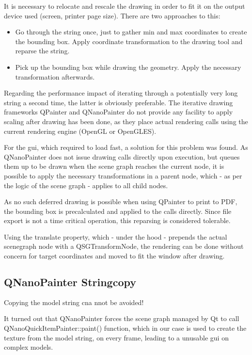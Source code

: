It is necessary to relocate and rescale the drawing in order to fit it on the output device used  (screen, printer page size). There are two approaches to this:
\begin{itemize}
	\item Go through the string once, just to gather min and max coordinates to create the bounding box. Apply coordinate transformation to the drawing tool and reparse the string.
	\item Pick up the bounding box while drawing the geometry. Apply the necessary transformation afterwards.
\end{itemize}
Regarding the performance impact of iterating through a potentially very long string a second time, the latter is obviously preferable. The iterative drawing frameworks QPainter and QNanoPainter do not provide any facility to apply scaling after drawing has been done, as they place actual rendering calls using the current rendering engine (OpenGL or OpenGLES).

For the \gls{gui}, which required to load fast, a solution for this problem was found. As QNanoPainter does not issue drawing calls directly upon execution, but queues them up to be drawn when the scene graph reaches the current node, it is possible to apply the necessary transformations in a parent node, which - as per the logic of the scene graph - applies to all child nodes.

As no such deferred drawing is possible when using QPainter to print to PDF, the bounding box is precalculated and applied to the calls directly. Since file export is not a time critical operation, this reparsing is considered tolerable.

Using the translate property, which - under the hood - prepends the actual scenegraph node with a QSGTransformNode, the rendering can be done without concern for target coordinates and moved to fit the window after drawing.

\subsection{QNanoPainter Stringcopy}

Copying the model string cna nnot be avoided!


It turned out that QNanoPainter forces the scene graph managed by Qt to call QNanoQuickItemPainter::paint() function, which in our case is used to create the texture from the model string, on every frame, leading to a unusable \gls{gui} on complex models.

